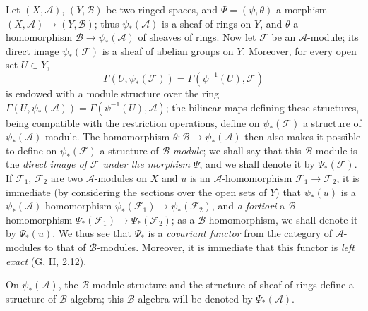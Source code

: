 \begin{env}[4.2.1]
\label{0.4.2.1}
Let $(X,\mathcal{A})$, $(Y,\mathcal{B})$ be two ringed spaces, and
$\Psi=(\psi,\theta)$ a morphism
$(X,\mathcal{A})\to(Y,\mathcal{B})$; thus $\psi_*(\mathcal{A})$ is a
sheaf of rings on $Y$, and $\theta$ a homomorphism
$\mathcal{B}\to\psi_*(\mathcal{A})$ of sheaves of rings. Now let
$\mathcal{F}$ be an $\mathcal{A}$-module; its direct image
$\psi_*(\mathcal{F})$ is a sheaf of abelian groups on $Y$. Moreover,
for every open set $U\subset Y$,
\[
  \Gamma(U,\psi_*(\mathcal{F}))
  =\Gamma(\psi^{-1}(U),\mathcal{F})
\]
is endowed with a module structure over the ring
$\Gamma(U,\psi_*(\mathcal{A}))=\Gamma(\psi^{-1}(U),\mathcal{A})$; the
bilinear maps defining these structures, being compatible
with the restriction operations, define on $\psi_*(\mathcal{F})$ a
structure of $\psi_*(\mathcal{A})$-module. The homomorphism
$\theta:\mathcal{B}\to\psi_*(\mathcal{A})$ then also makes it possible to define on
$\psi_*(\mathcal{F})$ a structure of $\mathcal{B}$-\emph{module}; we shall say that
this $\mathcal{B}$-module is the \emph{direct image of $\mathcal{F}$ under the
morphism $\Psi$}, and we shall denote it by $\Psi_*(\mathcal{F})$. If
$\mathcal{F}_1$, $\mathcal{F}_2$ are two $\mathcal{A}$-modules on $X$ and
$u$ is an $\mathcal{A}$-homomorphism $\mathcal{F}_1\to\mathcal{F}_2$, it is
immediate (by considering the sections over the open sets of $Y$) that
$\psi_*(u)$ is a $\psi_*(\mathcal{A})$-homomorphism
$\psi_*(\mathcal{F}_1)\to\psi_*(\mathcal{F}_2)$, and \emph{a fortiori} a
$\mathcal{B}$-homomorphism
$\Psi_*(\mathcal{F}_1)\to\Psi_*(\mathcal{F}_2)$; as a
$\mathcal{B}$-homomorphism, we shall denote it by $\Psi_*(u)$. We thus see that
$\Psi_*$ is a \emph{covariant functor} from the category of
$\mathcal{A}$-modules to that of $\mathcal{B}$-modules. Moreover, it is
immediate that this functor is \emph{left exact} (G, II, 2.12).

On $\psi_*(\mathcal{A})$, the $\mathcal{B}$-module structure and the
structure of sheaf of rings define a structure of
$\mathcal{B}$-algebra; this $\mathcal{B}$-algebra will be denoted by
$\Psi_*(\mathcal{A})$.
\end{env}

